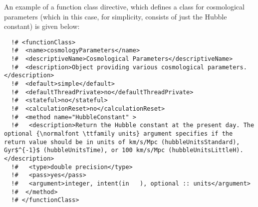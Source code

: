 An example of a function class directive, which defines a class for cosmological parameters (which in this case, for simplicity, consists of just the Hubble constant) is given below:

\begin{lstlisting}
  !# <functionClass>
  !#  <name>cosmologyParameters</name>
  !#  <descriptiveName>Cosmological Parameters</descriptiveName>
  !#  <description>Object providing various cosmological parameters.</description>
  !#  <default>simple</default>
  !#  <defaultThreadPrivate>no</defaultThreadPrivate>
  !#  <stateful>no</stateful>
  !#  <calculationReset>no</calculationReset>
  !#  <method name="HubbleConstant" >
  !#   <description>Return the Hubble constant at the present day. The optional {\normalfont \ttfamily units} argument specifies if the return value should be in units of km/s/Mpc (hubbleUnitsStandard), Gyr$^{-1}$ (hubbleUnitsTime), or 100 km/s/Mpc (hubbleUnitsLittleH).</description>
  !#   <type>double precision</type>
  !#   <pass>yes</pass>
  !#   <argument>integer, intent(in   ), optional :: units</argument>
  !#  </method>
  !# </functionClass>
\end{lstlisting}

